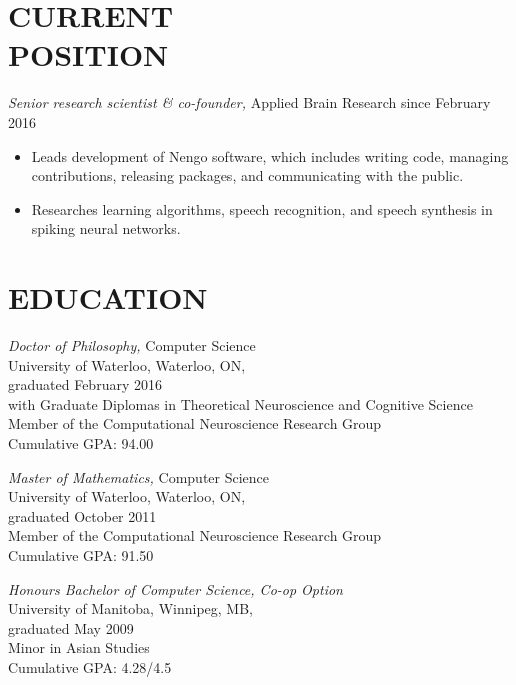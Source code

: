 \documentclass[line,margin]{res}
\begin{document}

\begin{resume}

\section{CURRENT \\ POSITION}

{\sl Senior research scientist \& co-founder,} Applied Brain Research
\hfill since February 2016
\begin{itemize} \itemsep -2pt
  \item Leads development of Nengo software, which includes
    writing code, managing contributions,
    releasing packages, and communicating with the public.
  \item Researches learning algorithms,
    speech recognition, and speech synthesis
    in spiking neural networks.
\end{itemize} \vspace{-4pt}

\section{EDUCATION}

{\sl Doctor of Philosophy,} Computer Science \\
University of Waterloo, Waterloo, ON, \\
graduated February 2016 \\
with Graduate Diplomas in Theoretical Neuroscience and Cognitive Science \\
Member of the Computational Neuroscience Research Group \\
Cumulative GPA: 94.00

{\sl Master of Mathematics,} Computer Science \\
University of Waterloo, Waterloo, ON, \\
graduated October 2011 \\
Member of the Computational Neuroscience Research Group \\
Cumulative GPA: 91.50

{\sl Honours Bachelor of Computer Science, Co-op Option} \\
University of Manitoba, Winnipeg, MB, \\
graduated May 2009 \\
Minor in Asian Studies \\
Cumulative GPA: 4.28/4.5


\end{resume}
\end{document}
